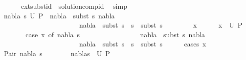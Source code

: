 \begin{isabellebody}
\ \ \ \ \ \ ext{\isacharunderscore}{\kern0pt}subst{\isacharunderscore}{\kern0pt}id\ \ solution{\isacharunderscore}{\kern0pt}comp{\isacharunderscore}{\kern0pt}id{\isacharparenleft}{\kern0pt}{}{\isacharparenright}{\kern0pt}\ \isamarkupfalse%
\ simp\isanewline
\ \ \ \ \ \ \ \ \ \ \ \ \ \ \ \ \ \ \ \ \ \ \ \ \ \ \ \ \isanewline
\ \ \isamarkupfalse%
\ {\isachardoublequoteopen}{\isasymforall}{\isacharparenleft}{\kern0pt}nabla{}{\isacharcomma}{\kern0pt}\ s{}{\isacharparenright}{\kern0pt}{\isasymin}\ U\ P{\isachardot}{\kern0pt}\ \ nabla{}\ {\isasymTurnstile}\ {\isacharparenleft}{\kern0pt}subst\ s{}{\isacharparenright}{\kern0pt}\ nabla\ {\isasymand}\ \ \isanewline
\ \ \ \ \ \ \ \ \ \ \ \ \ \ \ \ \ \ \ \ \ \ \ nabla{}\ {\isasymTurnstile}\ subst\ {\isacharparenleft}{\kern0pt}s{}\ {\isasymbullet}\ s{\isacharparenright}{\kern0pt}\ {\isasymapprox}\ subst\ s{}{\isachardoublequoteclose}\isanewline
\ \ \isamarkupfalse%
\isanewline
\ \ \ \ \isamarkupfalse%
\ x\isanewline
\ \ \ \ \isamarkupfalse%
\ {\isachardoublequoteopen}x\ {\isasymin}\ U\ P{\isachardoublequoteclose}\isanewline
\ \ \ \ \isamarkupfalse%
\ \isamarkupfalse%
\ {\isachardoublequoteopen}case\ x\ of\ {\isacharparenleft}{\kern0pt}nabla{}{\isacharcomma}{\kern0pt}\ s{}{\isacharparenright}{\kern0pt}\ {\isasymRightarrow}\ \isanewline
\ \ \ \ \ \ \ \ \ \ \ \ \ \ \ nabla{}\ {\isasymTurnstile}\ {\isacharparenleft}{\kern0pt}subst\ s{}{\isacharparenright}{\kern0pt}\ nabla\ {\isasymand}\ \ \isanewline
\ \ \ \ \ \ \ \ \ \ \ \ \ \ \ \ \ \ \ \ \ \ \ nabla{}\ {\isasymTurnstile}\ subst\ {\isacharparenleft}{\kern0pt}s{}\ {\isasymbullet}\ s{\isacharparenright}{\kern0pt}\ {\isasymapprox}\ subst\ s{}{\isachardoublequoteclose}\isanewline
\ \ \ \ \isamarkupfalse%
\ {\isacharparenleft}{\kern0pt}cases\ x{\isacharparenright}{\kern0pt}\isanewline
\ \ \ \ \ \ \isamarkupfalse%
\ {\isacharparenleft}{\kern0pt}Pair\ nabla{}\ s{}{\isacharparenright}{\kern0pt}\isanewline
\ \ \ \ \ \ \isamarkupfalse%
\ {\isachardoublequoteopen}{\isacharparenleft}{\kern0pt}nabla{}{\isacharcomma}{\kern0pt}s{}{\isacharparenright}{\kern0pt}\ {\isasymin}\ U\ P{\isachardoublequoteclose}\isanewline
\ \ \ \ \ \ \ \ \isamarkupfalse%

\end{isabellebody}
